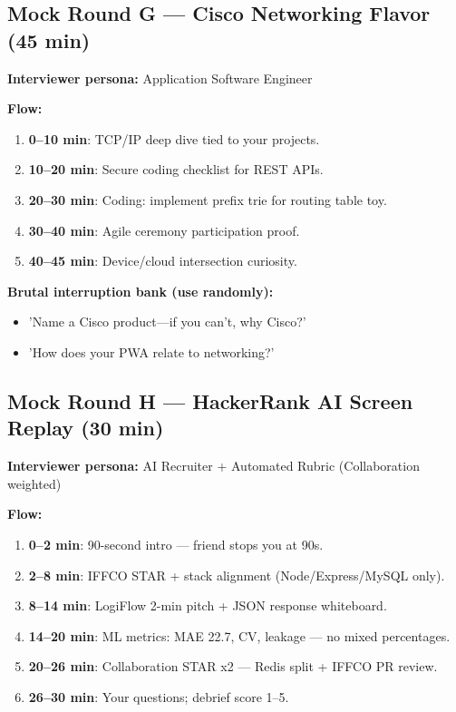 \documentclass[9pt,a4paper]{article}
\begin{document}
\subsection{Mock Round G --- Cisco Networking Flavor (45 min)}
\textbf{Interviewer persona:} Application Software Engineer

\textbf{Flow:}
\begin{enumerate}
  \item \textbf{0--10 min}: TCP/IP deep dive tied to your projects.
  \item \textbf{10--20 min}: Secure coding checklist for REST APIs.
  \item \textbf{20--30 min}: Coding: implement prefix trie for routing table toy.
  \item \textbf{30--40 min}: Agile ceremony participation proof.
  \item \textbf{40--45 min}: Device/cloud intersection curiosity.
\end{enumerate}

\textbf{Brutal interruption bank (use randomly):}
\begin{itemize}
  \item 'Name a Cisco product---if you can't, why Cisco?'
  \item 'How does your PWA relate to networking?'
\end{itemize}

\subsection{Mock Round H --- HackerRank AI Screen Replay (30 min)}
\textbf{Interviewer persona:} AI Recruiter + Automated Rubric (Collaboration weighted)

\textbf{Flow:}
\begin{enumerate}
  \item \textbf{0--2 min}: 90-second intro --- friend stops you at 90s.
  \item \textbf{2--8 min}: IFFCO STAR + stack alignment (Node/Express/MySQL only).
  \item \textbf{8--14 min}: LogiFlow 2-min pitch + JSON response whiteboard.
  \item \textbf{14--20 min}: ML metrics: MAE 22.7, CV, leakage --- no mixed percentages.
  \item \textbf{20--26 min}: Collaboration STAR x2 --- Redis split + IFFCO PR review.
  \item \textbf{26--30 min}: Your questions; debrief score 1--5.
\end{enumerate}
\end{document}
